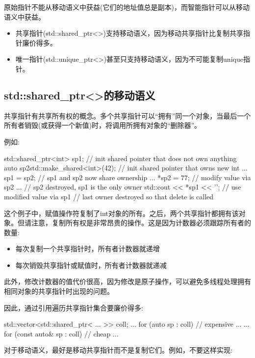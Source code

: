 原始指针不能从移动语义中获益(它们的地址值总是副本)，而智能指针可以从移动语义中获益。

\begin{itemize}
	\item 共享指针(std::shared_ptr<>)支持移动语义，因为移动共享指针比复制共享指针廉价得多。
	\item 唯一指针(std::unique_ptr<>)甚至只支持移动语义，因为不可能复制unique指针。
\end{itemize}

\subsection{std::shared_ptr<>的移动语义}

共享指针有共享所有权的概念。多个共享指针可以“拥有”同一个对象，当最后一个所有者销毁(或获得一个新值)时，将调用所拥有对象的“删除器”。

例如:

\begin{cppcode}
{
	std::shared_ptr<int> sp1; // init shared pointer that does not own anything
	{
		auto sp2{std::make_shared<int>(42)}; // init shared pointer that owns new int
		...
		sp1 = sp2; // sp1 and sp2 now share ownership
		...
		*sp2 = 77; // modify value via sp2
		...
	} // sp2 destroyed, sp1 is the only owner
	std::cout << *sp1 << '\n'; // use modified value via sp1
} // last owner destroyed so that delete is called
\end{cppcode}

这个例子中，赋值操作符复制了int对象的所有。之后，两个共享指针都拥有该对象。但请注意，复制所有权是非常昂贵的操作。这是因为计数器必须跟踪所有者的数量:

\begin{itemize}
	\item 每次复制一个共享指针时，所有者计数器就递增
	\item 每次销毁共享指针或赋值时，所有者计数器就递减
\end{itemize}

此外，修改计数器的值代价很高，因为修改是原子操作，可以避免多线程处理拥有相同对象的共享指针时出现的问题。

因此，通过引用遍历共享指针集合要廉价得多:

\begin{cppcode}
std::vector<std::shared_ptr< ... >> coll;
...
for (auto sp : coll) { // expensive
	...
}
...
for (const auto& sp : coll) { // cheap
	...
}
\end{cppcode}

对于移动语义，最好是移动共享指针而不是复制它们。例如，不要这样实现:

